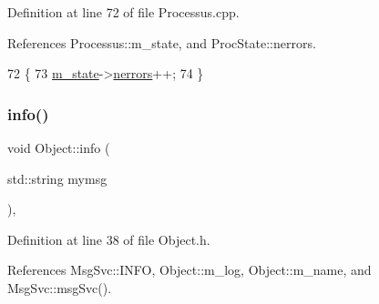 Definition at line 72 of file Processus.\+cpp.



References Processus\+::m\+\_\+state, and Proc\+State\+::nerrors.


\begin{DoxyCode}
72                            \{
73   \hyperlink{classProcessus_ab3539eee42891ceae0baf4395ae7fb61}{m\_state}->\hyperlink{structProcState_a51a0f54ba62b07e07ac8518c5f32828d}{nerrors}++;
74 \}
\end{DoxyCode}
\mbox{\label{classObject_a644fd329ea4cb85f54fa6846484b84a8}} 
\subsubsection{\texorpdfstring{info()}{info()}\hspace{0.1cm}{\footnotesize\ttfamily [1/2]}}
{\footnotesize\ttfamily void Object\+::info (\begin{DoxyParamCaption}\item[{std\+::string}]{mymsg }\end{DoxyParamCaption})\hspace{0.3cm}{\ttfamily [inline]}, {\ttfamily [inherited]}}



Definition at line 38 of file Object.\+h.



References Msg\+Svc\+::\+I\+N\+FO, Object\+::m\+\_\+log, Object\+::m\+\_\+name, and Msg\+Svc\+::msg\+Svc().



